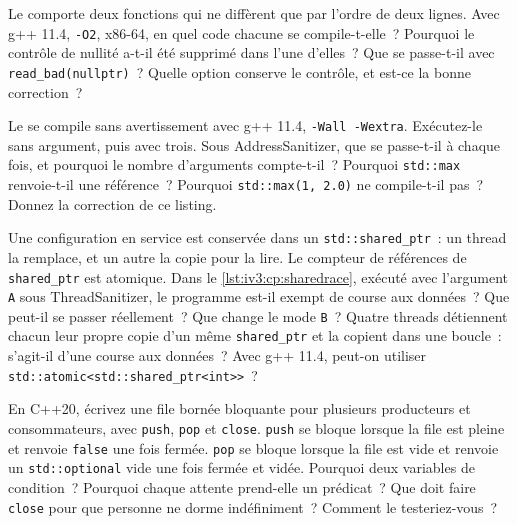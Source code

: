 \begin{question}\label{iq:iv3:cpp:48}
Le  comporte deux fonctions qui ne diffèrent que par l'ordre de deux lignes. Avec g++ 11.4, \texttt{-O2}, x86-64, en quel code chacune se compile-t-elle~? Pourquoi le contrôle de nullité a-t-il été supprimé dans l'une d'elles~? Que se passe-t-il avec \texttt{read\_bad(nullptr)}~? Quelle option conserve le contrôle, et est-ce la bonne correction~?
\label{lst:iv3:cp:nullcheck}
\end{question}

\begin{question}\label{iq:iv3:cpp:49}
Le  se compile sans avertissement avec g++ 11.4, \texttt{-Wall -Wextra}. Exécutez-le sans argument, puis avec trois. Sous AddressSanitizer, que se passe-t-il à chaque fois, et pourquoi le nombre d'arguments compte-t-il~? Pourquoi \texttt{std::max} renvoie-t-il une référence~? Pourquoi \texttt{std::max(1, 2.0)} ne compile-t-il pas~? Donnez la correction de ce listing.
\label{lst:iv3:cp:maxdangle}
\end{question}

\begin{question}\label{iq:iv3:cpp:50}
Une configuration en service est conservée dans un \texttt{std::shared\_ptr}~: un thread la remplace, et un autre la copie pour la lire. Le compteur de références de \texttt{shared\_ptr} est atomique. Dans le \cref{lst:iv3:cp:sharedrace}, exécuté avec l'argument \texttt{A} sous ThreadSanitizer, le programme est-il exempt de course aux données~? Que peut-il se passer réellement~? Que change le mode \texttt{B}~? Quatre threads détiennent chacun leur propre copie d'un même \texttt{shared\_ptr} et la copient dans une boucle~: s'agit-il d'une course aux données~? Avec g++ 11.4, peut-on utiliser \texttt{std::atomic<std::shared\_ptr<int>{}>}~?
\label{lst:iv3:cp:sharedrace}
\end{question}

\begin{question}\label{iq:iv3:cpp:51}
En C++20, écrivez une file bornée bloquante pour plusieurs producteurs et consommateurs, avec \texttt{push}, \texttt{pop} et \texttt{close}. \texttt{push} se bloque lorsque la file est pleine et renvoie \texttt{false} une fois fermée. \texttt{pop} se bloque lorsque la file est vide et renvoie un \texttt{std::optional} vide une fois fermée et vidée. Pourquoi deux variables de condition~? Pourquoi chaque attente prend-elle un prédicat~? Que doit faire \texttt{close} pour que personne ne dorme indéfiniment~? Comment le testeriez-vous~?
\end{question}


